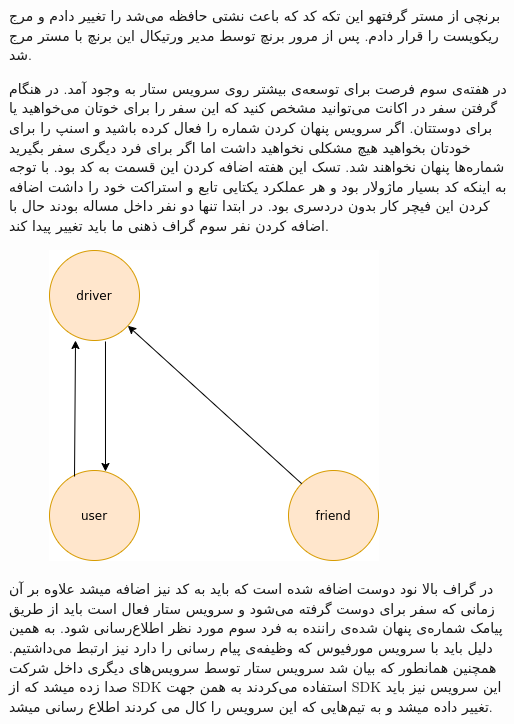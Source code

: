 \documentclass[a4]{report}
\begin{document}
برنچی از مستر گرفتهو این تکه کد که باعث نشتی حافظه می‌شد را تغییر دادم و مرج ریکويست را قرار دادم. پس از مرور برنچ توسط مدیر ورتیکال این برنچ با مستر مرج شد.


در هفته‌ی سوم فرصت برای توسعه‌ی بیشتر روی سرویس ستار به وجود آمد.
در هنگام گرفتن سفر در اکانت می‌توانید مشخص کنید که این سفر را برای خوتان می‌خواهید یا برای دوستتان.
اگر سرویس پنهان کردن شماره را فعال کرده باشید و اسنپ را برای خودتان بخواهید هیچ مشکلی نخواهید داشت اما اگر برای فرد دیگری سفر بگیرید شماره‌ها پنهان نخواهند شد.
تسک این هفته اضافه کردن این قسمت به کد بود.
با توجه به اینکه کد بسیار ماژولار بود و هر عملکرد یکتایی تابع و استراکت خود را داشت اضافه کردن این فیچر کار بدون دردسری بود.
در ابتدا تنها دو نفر داخل مساله بودند حال با اضافه کردن نفر سوم گراف ذهنی ما باید
تغییر پیدا کند.

\begin{figure}
  \centering
  \includegraphics[scale=0.5]{fig/call-graph}
\end{figure}

در گراف بالا نود دوست اضافه شده است که باید به کد نیز اضافه میشد علاوه بر آن زمانی که سفر برای دوست گرفته می‌شود و سرویس ستار فعال است
باید از طریق پیامک شماره‌ی پنهان شده‌ی راننده به فرد سوم مورد نظر اطلاع‌رسانی شود.
به همین دلیل باید با سرویس مورفیوس که وظیفه‌ی پیام رسانی را دارد نیز ارتبط می‌داشتیم.
همچنین همانطور که بیان شد سرویس ستار توسط سرویس‌های دیگری داخل شرکت صدا زده میشد که از SDK استفاده می‌کردند
به همن جهت SDK این سرویس نیز باید تغییر داده میشد و به تیم‌هایی که این سرویس را کال می کردند اطلاع رسانی میشد.
\end{document}
